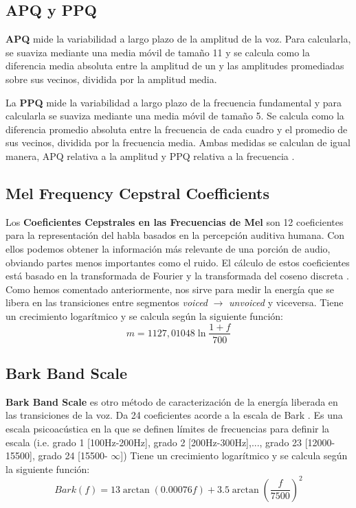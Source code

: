 \subsection{APQ y PPQ}
\textbf{APQ} mide la variabilidad a largo plazo de la amplitud de la voz. Para calcularla, se suaviza mediante una media móvil de tamaño 11 y se calcula como la diferencia media absoluta entre la amplitud de un  y las amplitudes promediadas sobre sus vecinos, dividida por la amplitud media.

La \textbf{PPQ} mide la variabilidad a largo plazo de la frecuencia fundamental y para calcularla se suaviza mediante una media móvil de tamaño 5. Se calcula como la diferencia promedio absoluta entre la frecuencia de cada cuadro y el promedio de sus vecinos, dividida por la frecuencia media. Ambas medidas se calculan de igual manera, APQ relativa a la amplitud y PPQ relativa a la frecuencia \cite{neurospeech}.

\subsection{Mel Frequency Cepstral Coefficients}
Los \textbf{Coeficientes Cepstrales en las Frecuencias de Mel} son 12 coeficientes para la representación del habla basados en la percepción auditiva humana. Con ellos podemos obtener la información más relevante de una porción de audio, obviando partes menos importantes como el ruido. El cálculo de estos coeficientes está basado en la transformada de Fourier y la transformada del coseno discreta \cite{wiki:mfcc}. Como hemos comentado anteriormente, nos sirve para medir la energía que se libera en las transiciones entre segmentos \textit{voiced} $\rightarrow$ \textit{unvoiced} y viceversa. Tiene un crecimiento logarítmico y se calcula según la siguiente función:
\begin{equation}
m = 1127,01048\ln{\frac{1+f}{700}}
\end{equation}

\subsection{Bark Band Scale}
\textbf{Bark Band Scale} es otro método de caracterización de la energía liberada en las transiciones de la voz. Da 24 coeficientes acorde a la escala de Bark \cite{bbe}. Es una escala psicoacústica en la que se definen límites de frecuencias para definir la escala (i.e. grado 1 [100Hz-200Hz], grado 2 [200Hz-300Hz],..., grado 23 [12000-15500], grado 24 [15500- $\infty$])
Tiene un crecimiento logarítmico y se calcula según la siguiente función:
\begin{equation}
\mathit{Bark}(f) = 13 \arctan(0.00076 f)+ 3.5 \arctan \left ( \frac{f}{7500} \right )^{2}
\end{equation}


